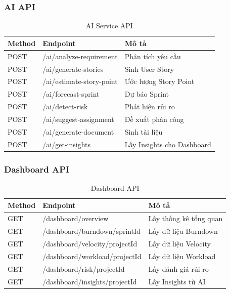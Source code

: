 \documentclass[12pt,a4paper]{report}
\begin{document}
\subsubsection{AI API}

\begin{table}[H]
\centering
\caption{AI Service API}
\begin{tabular}{|p{2.5cm}|p{4cm}|p{8cm}|}
\hline
\textbf{Method} & \textbf{Endpoint} & \textbf{Mô tả} \\
\hline
POST & /ai/analyze-requirement & Phân tích yêu cầu \\
\hline
POST & /ai/generate-stories & Sinh User Story \\
\hline
POST & /ai/estimate-story-point & Ước lượng Story Point \\
\hline
POST & /ai/forecast-sprint & Dự báo Sprint \\
\hline
POST & /ai/detect-risk & Phát hiện rủi ro \\
\hline
POST & /ai/suggest-assignment & Đề xuất phân công \\
\hline
POST & /ai/generate-document & Sinh tài liệu \\
\hline
POST & /ai/get-insights & Lấy Insights cho Dashboard \\
\hline
\end{tabular}
\label{tab:ai_api}
\end{table}

\subsubsection{Dashboard API}

\begin{table}[H]
\centering
\caption{Dashboard API}
\begin{tabular}{|p{2.5cm}|p{4cm}|p{8cm}|}
\hline
\textbf{Method} & \textbf{Endpoint} & \textbf{Mô tả} \\
\hline
GET & /dashboard/overview & Lấy thống kê tổng quan \\
\hline
GET & /dashboard/burndown/{sprintId} & Lấy dữ liệu Burndown \\
\hline
GET & /dashboard/velocity/{projectId} & Lấy dữ liệu Velocity \\
\hline
GET & /dashboard/workload/{projectId} & Lấy dữ liệu Workload \\
\hline
GET & /dashboard/risk/{projectId} & Lấy đánh giá rủi ro \\
\hline
GET & /dashboard/insights/{projectId} & Lấy Insights từ AI \\
\hline
\end{tabular}
\label{tab:dashboard_api}
\end{table}
\end{document}
